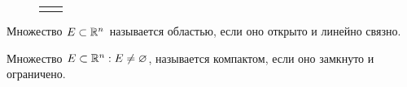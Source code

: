 \Example
\begin{figure}[h]
	\begin{center}
	    	\begin{minipage}[h]{0.49\linewidth}
		\end{minipage}
		\hfill
		\begin{minipage}[h]{0.49\linewidth}
		\end{minipage}
		\begin{minipage}[h]{1\linewidth}
			\begin{tabular}{p{0.49\linewidth}p{0.49\linewidth}}
				\centering {линейно связно} & 
				\centering {не линейно связно} \\
			\end{tabular}
		\end{minipage}
	\end{center}
	\vspace*{-1cm}
	\caption {}
\end{figure}

\Def Множество $E \subset \mathbb{R}^n$ называется областью, если оно открыто и линейно связно.

\Def Множество $E \subset \mathbb{R}^n : E \neq \varnothing $, называется компактом, если оно замкнуто и ограничено.

